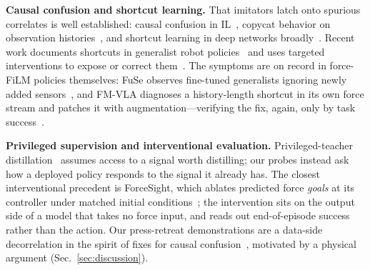 \textbf{Causal confusion and shortcut learning.}
That imitators latch onto spurious correlates is well established: causal confusion in
IL~\cite{dehaan2019causal}, copycat behavior on observation histories~\cite{wen2020copycat},
and shortcut learning in deep networks broadly~\cite{geirhos2020shortcut,hermann2023foundations}.
Recent work documents shortcuts in generalist robot policies~\cite{shortcutgeneralist} and uses
targeted interventions to expose or correct them~\cite{interventionil2025,interventionil2023}.
The symptoms are on record in force-FiLM policies themselves: FuSe observes fine-tuned
generalists ignoring newly added sensors~\cite{fuse}, and FM-VLA diagnoses a history-length
shortcut in its own force stream and patches it with augmentation---verifying the fix, again,
only by task success~\cite{fmvla}.

\textbf{Privileged supervision and interventional evaluation.}
Privileged-teacher distillation~\cite{chen2020lbc,privilegedaction} assumes access to a signal
worth distilling; our probes instead ask how a deployed policy responds to the signal it already
has. The closest interventional precedent is ForceSight, which ablates predicted force
\emph{goals} at its controller under matched initial conditions~\cite{forcesight}; the
intervention sits on the output side of a model that takes no force input, and reads out
end-of-episode success rather than the action. Our press-retreat demonstrations are a data-side
decorrelation in the spirit of fixes for causal confusion~\cite{dehaan2019causal}, motivated
by a physical argument (Sec.~\ref{sec:discussion}).
